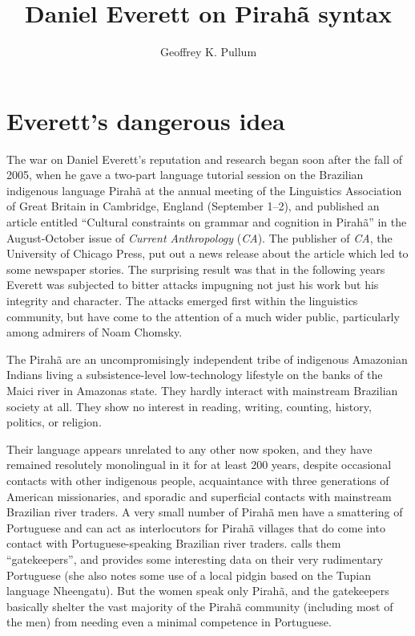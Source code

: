 \documentclass[output=paper,colorlinks,citecolor=brown
]{langscibook}
\author{Geoffrey K. Pullum\orcid{0000-0002-7748-8847}\affiliation{University of Edinburgh}}
\title{Daniel Everett on Pirahã syntax}
\begin{document}
\maketitle
\label{chap-3_pullum}


\section{Everett's dangerous idea}\label{intro}

The war on Daniel Everett's reputation and research began soon after
the fall of 2005, when he gave a two-part language tutorial session
on the Brazilian indigenous language Pirahã at the annual meeting
of the Linguistics Association of Great Britain in Cambridge, England
(September 1--2), and published an article entitled ``Cultural constraints
on grammar and cognition in Pirahã'' in the August-October issue of
\textit{Current Anthropology} (\textit{CA}). The publisher of \textit{CA},
the University of Chicago Press, put out a news release about the article
which led to some newspaper stories. The surprising result was that in
the following years Everett was subjected to bitter attacks impugning
not just his work but his integrity and character. The attacks emerged
first within the linguistics community, but have come to the attention
of a much wider public, particularly among admirers of Noam Chomsky.

The Pirahã are an uncompromisingly independent tribe of indigenous
Amazonian Indians living a subsistence-level low-technology lifestyle
on the banks of the Maici river in Amazonas state. They hardly interact
with mainstream Brazilian society at all. They show no interest in
reading, writing, counting, history, politics, or religion.

Their language appears unrelated to any other now spoken, and they
have remained resolutely monolingual in it for at least 200 years,
despite occasional contacts with other indigenous people, 
acquaintance with three generations of American missionaries, and
sporadic and superficial contacts with mainstream Brazilian river
traders. A very small number of Pirahã men have a smattering of
Portuguese and can act as interlocutors for Pirahã villages that
do come into contact with Portuguese-speaking Brazilian river traders.
\citet{Sakel12} calls them ``gatekeepers'', and provides some interesting
data on their very rudimentary Portuguese (she also notes some use
of a local pidgin based on the Tupian language Nheengatu). But the
women speak only Pirahã, and the gatekeepers basically shelter
the vast majority of the Pirahã community (including most of the
men) from needing even a minimal competence in Portuguese.
\end{document}
